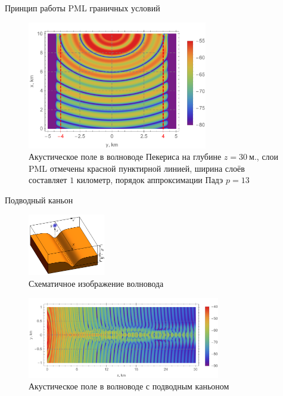\documentclass{fefu_presentation}
\begin{document}
     \begin{frame}[fragile]{Принцип работы PML граничных условий}
         \begin{figure}[h]
             \centering
             \includegraphics[width=0.7\textwidth]{pekeris_pml_n13.pdf}
             \caption{Акустическое поле в волноводе Пекериса на глубине $z=30\ \text{м.}$, слои PML отмечены красной пунктирной линией, ширина слоёв составляет $1$ километр, порядок аппроксимации Падэ $p=13$}
         \end{figure}
     \end{frame}


     \begin{frame}[fragile]{Подводный каньон}
         \vspace{-0.25cm}
         \begin{figure}[h]
             \centering
             \includegraphics[width=0.3\textwidth]{canyon_transparent.png}
             \caption{Схематичное изображение волновода}
         \end{figure}
         \vspace{-0.75cm}
         \begin{figure}[h]
             \centering
             \includegraphics[width=0.75\textwidth]{canyon_n11.pdf}
             \caption{Акустическое поле в волноводе с подводным каньоном}
         \end{figure}
     \end{frame}
\end{document}
